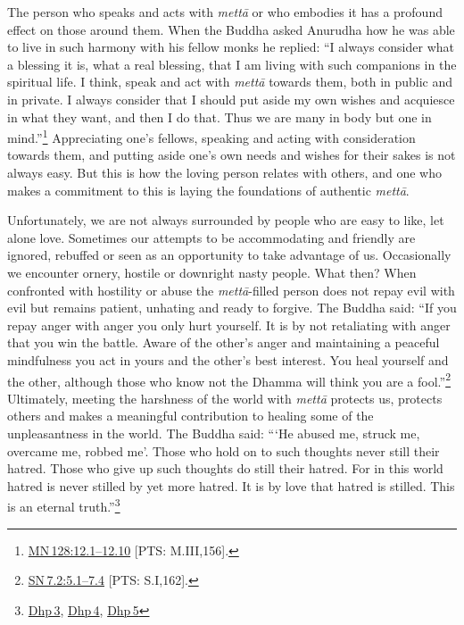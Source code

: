\documentclass[10pt, openright]{book}
\begin{document}
The person who speaks and acts with \textit{mettā} or who embodies it has a profound effect on those around them. When the Buddha asked Anurudha how he was able to live in such harmony with his fellow monks he replied: “I always consider what a blessing it is, what a real blessing, that I am living with such companions in the spiritual life. I think, speak and act with \textit{mettā} towards them, both in public and in private. I always consider that I should put aside my own wishes and acquiesce in what they want, and then I do that. Thus we are many in body but one in mind.”\footnote {\href{https://suttacentral.net/mn128/en/sujato\#12.1}{MN 128:12.1–12.10} [PTS: M.III,156].} Appreciating one’s fellows, speaking and acting with consideration towards them, and putting aside one’s own needs and wishes for their sakes is not always easy. But this is how the loving person relates with others, and one who makes a commitment to this is laying the foundations of authentic \textit{mettā}.


Unfortunately, we are not always surrounded by people who are easy to like, let alone love. Sometimes our attempts to be accommodating and friendly are ignored, rebuffed or seen as an opportunity to take advantage of us. Occasionally we encounter ornery, hostile or downright nasty people. What then? When confronted with hostility or abuse the \textit{mettā}-filled person does not repay evil with evil but remains patient, unhating and ready to forgive. The Buddha said: “If you repay anger with anger you only hurt yourself. It is by not retaliating with anger that you win the battle. Aware of the other’s anger and maintaining a peaceful mindfulness you act in yours and the other’s best interest. You heal yourself and the other, although those who know not the Dhamma will think you are a fool.”\footnote {\href{https://suttacentral.net/sn7.2/en/sujato\#5.1}{SN 7.2:5.1–7.4} [PTS: S.I,162].} Ultimately, meeting the harshness of the world with \textit{mettā} protects us, protects others and makes a meaningful contribution to healing some of the unpleasantness in the world. The Buddha said: “‘He abused me, struck me, overcame me, robbed me’. Those who hold on to such thoughts never still their hatred. Those who give up such thoughts do still their hatred. For in this world hatred is never stilled by yet more hatred. It is by love that hatred is stilled. This is an eternal truth.”\footnote {\href{https://suttacentral.net/dhp3/en/sujato}{Dhp 3}, \href{https://suttacentral.net/dhp4/en/sujato}{Dhp 4}, \href{https://suttacentral.net/dhp5/en/sujato}{Dhp 5}}
\end{document}
